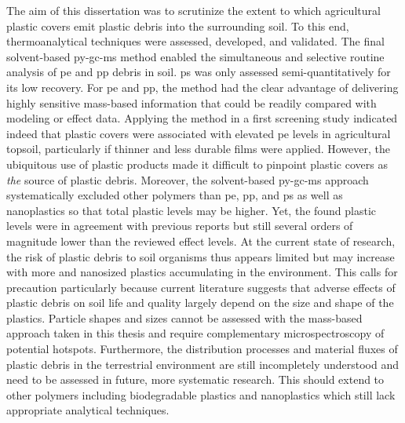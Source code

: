 The aim of this dissertation was to scrutinize the extent to which agricultural plastic covers emit plastic debris into the surrounding soil. To this end, thermoanalytical techniques were assessed, developed, and validated. The final solvent-based \ac{py-gc-ms} method enabled the simultaneous and selective routine analysis of \ac{pe} and \ac{pp} debris in soil. \Ac{ps} was only assessed semi-quantitatively for its low recovery. For \ac{pe} and \ac{pp}, the method had the clear advantage of delivering highly sensitive mass-based information that could be readily compared with modeling or effect data. Applying the method in a first screening study indicated indeed that plastic covers were associated with elevated \ac{pe} levels in agricultural topsoil, particularly if thinner and less durable films were applied. However, the ubiquitous use of plastic products made it difficult to pinpoint plastic covers as \emph{the} source of plastic debris. Moreover, the solvent-based \ac{py-gc-ms} approach systematically excluded other polymers than \ac{pe}, \ac{pp}, and \ac{ps} as well as nanoplastics so that total plastic levels may be higher. Yet, the found plastic levels were in agreement with previous reports but still several orders of magnitude lower than the reviewed effect levels.
At the current state of research, the risk of plastic debris to soil organisms thus appears limited but may increase with more and nanosized plastics accumulating in the environment. This calls for precaution particularly because current literature suggests that adverse effects of plastic debris on soil life and quality largely depend on the size and shape of the plastics. Particle shapes and sizes cannot be assessed with the mass-based approach taken in this thesis and require complementary microspectroscopy of potential hotspots.
Furthermore, the distribution processes and material fluxes of plastic debris in the terrestrial environment are still incompletely understood and need to be assessed in future, more systematic research. This should extend to other polymers including biodegradable plastics and nanoplastics which still lack appropriate analytical techniques.
